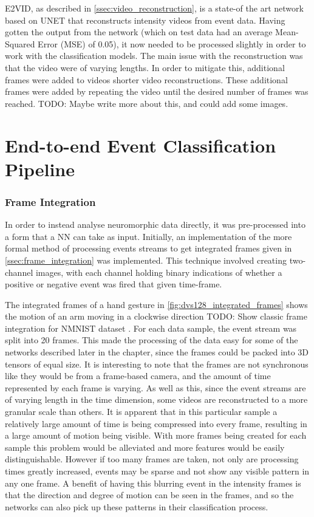 E2VID, as described in \cref{ssec:video_reconstruction}, is a state-of the art network based on UNET that reconstructs intensity videos from event data. Having gotten the output from the network (which on test data had an average Mean-Squared Error (MSE) of 0.05), it now needed to be processed slightly in order to work with the classification models. The main issue with the reconstruction was that the video were of varying lengths. In order to mitigate this, additional frames were added to videos shorter video reconstructions. These additional frames were added by repeating the video until the desired number of frames was reached. \color{red} TODO: Maybe write more about this, and could add some images. \color{black}

\section{End-to-end Event Classification Pipeline}

\subsubsection{Frame Integration}

In order to instead analyse neuromorphic data directly, it was pre-processed into a form that a NN can take as input. Initially, an implementation of the more formal method of processing events streams to get integrated frames given in \cref{ssec:frame_integration} was implemented. This technique involved creating two-channel images, with each channel holding binary indications of whether a positive or negative event was fired that given time-frame.

The integrated frames of a hand gesture in \cref{fig:dvs128_integrated_frames} shows the motion of an arm moving in a clockwise direction \color{red} TODO: Show classic frame integration for NMNIST dataset \color{black}. For each data sample, the event stream was split into 20 frames. This made the processing of the data easy for some of the networks described later in the chapter, since the frames could be packed into 3D tensors of equal size. It is interesting to note that the frames are not synchronous like they would be from a frame-based camera, and the amount of time represented by each frame is varying. As well as this, since the event streams are of varying length in the time dimension, some videos are reconstructed to a more granular scale than others. It is apparent that in this particular sample a relatively large amount of time is being compressed into every frame, resulting in a large amount of motion being visible. With more frames being created for each sample this problem would be alleviated and more features would be easily distinguishable. However if too many frames are taken, not only are processing times greatly increased, events may be sparse and not show any visible pattern in any one frame. A benefit of having this blurring event in the intensity frames is that the direction and degree of motion can be seen in the frames, and so the networks can also pick up these patterns in their classification process.

